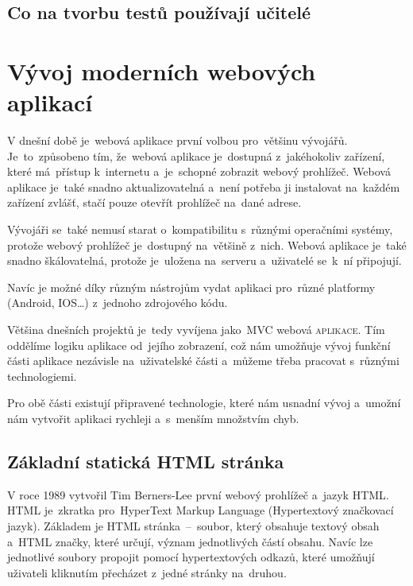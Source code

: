 \documentclass[14pt,a4paper]{article}
\begin{document}
        \subsection{Co na tvorbu testů používají učitelé}

    \section{Vývoj moderních webových aplikací}
    V dnešní době je~webová aplikace první volbou pro~většinu vývojářů. Je~to~způsobeno tím, že~webová aplikace je~dostupná z~jakéhokoliv zařízení, které má~přístup k~internetu a~je~schopné zobrazit webový prohlížeč. Webová aplikace je~také snadno aktualizovatelná a~není potřeba ji instalovat na~každém zařízení zvlášť, stačí pouze otevřít prohlížeč na~dané adrese.
    
    Vývojáři se~také nemusí starat o~kompatibilitu s~různými operačními systémy, protože webový prohlížeč
    je~dostupný na~většině z~nich. Webová aplikace je~také snadno škálovatelná, protože je~uložena na~serveru a~uživatelé se~k~ní připojují.
    
    Navíc je možné díky různým nástrojům vydat aplikaci pro~různé platformy (Android, IOS\dots) z~jednoho zdrojového kódu.\parencite{adobe:webapp}

    Většina dnešních projektů je~tedy vyvíjena jako~MVC webová \textsc{aplikace}. Tím oddělíme logiku aplikace od~jejího zobrazení, což nám umožňuje vývoj funkční části aplikace nezávisle na~uživatelské části a~můžeme třeba pracovat s~různými technologiemi.
    
    Pro obě části existují připravené technologie, které nám usnadní vývoj a~umožní nám vytvořit aplikaci rychleji a~s~menším množstvím chyb.

    \parencite{itnetworkBestPractices}

        \subsection{Základní statická HTML stránka}
        V roce 1989 vytvořil Tim Berners-Lee první webový prohlížeč a~jazyk HTML. HTML je~zkratka pro~HyperText Markup Language (Hypertextový značkovací jazyk).
        Základem je HTML stránka~--~soubor, který obsahuje textový obsah a~HTML značky, které určují, význam jednotlivých částí obsahu.
        Navíc lze jednotlivé soubory propojit pomocí hypertextových odkazů, které umožňují uživateli kliknutím přecházet z~jedné stránky na~druhou.
\end{document}
